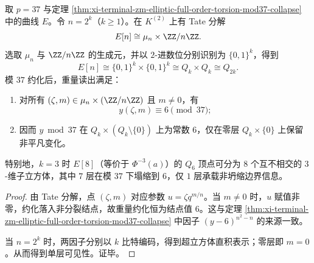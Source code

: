 \begin{theorem}\label{thm:xi-terminal-zm-tate-hypercube-single-layer-visibility}
取 \(p=37\) 与定理 \ref{thm:xi-terminal-zm-elliptic-full-order-torsion-mod37-collapse} 中的曲线 \(E\)。令 \(n=2^k\)（\(k\ge 1\)）。在 \(K^{(2)}\) 上有 Tate 分解
\[
E[n]\cong \mu_n\times \ZZ/n\ZZ.
\]
选取 \(\mu_n\) 与 \(\ZZ/n\ZZ\) 的生成元，并以 \(2\)-进数位分别识别为 \(\{0,1\}^k\)，得到
\[
E[n]\cong \{0,1\}^k\times \{0,1\}^k\cong Q_k\times Q_k\cong Q_{2k}.
\]
模 \(37\) 约化后，重量读出满足：
\begin{enumerate}
  \item 对所有 \((\zeta,m)\in \mu_n\times(\ZZ/n\ZZ)\) 且 \(m\neq 0\)，有
  \[
  y(\zeta,m)\equiv 6\pmod{37};
  \]
  \item 因而 \(y\bmod 37\) 在 \(Q_k\times (Q_k\setminus\{0\})\) 上为常数 \(6\)，仅在零层 \(Q_k\times\{0\}\) 上保留非平凡变化。
\end{enumerate}
特别地，\(k=3\) 时 \(E[8]\)（等价于 \(\Phi^{-3}(a)\)）的 \(Q_6\) 顶点可分为 \(8\) 个互不相交的 \(3\)-维子立方体，其中 \(7\) 层在模 \(37\) 下塌缩到 \(6\)，仅 \(1\) 层承载非坍缩边界信息。
\end{theorem}
\begin{proof}
由 Tate 分解，点 \((\zeta,m)\) 对应参数 \(u=\zeta q^{m/n}\)。当 \(m\neq 0\) 时，\(u\) 赋值非零，约化落入非分裂结点，故重量约化恒为结点值 \(6\)。这与定理 \ref{thm:xi-terminal-zm-elliptic-full-order-torsion-mod37-collapse} 中因子 \((y-6)^{n^2-n}\) 的来源一致。

当 \(n=2^k\) 时，两因子分别以 \(k\) 比特编码，得到超立方体直积表示；零层即 \(m=0\)。从而得到单层可见性。证毕。
\end{proof}

